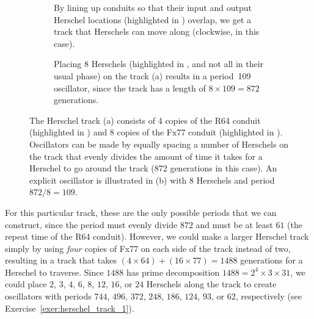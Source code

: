 \begin{figure}[!htb]
	\centering
	\begin{subfigure}{.48\textwidth}
		\centering
		\caption{By lining up conduits so that their input and output Herschel locations (highlighted in ) overlap, we get a track that Herschels can move along (clockwise, in this case).}
		\label{fig:herschel_track_1}
	\end{subfigure} \hfill %
	\begin{subfigure}{.48\textwidth}
		\centering
		\caption{Placing $8$ Herschels (highlighted in , and not all in their usual phase) on the track (a) results in a period~109 oscillator, since the track has a length of $8 \times 109 = 872$ generations.}
		\label{fig:herschel_track_1_109}
	\end{subfigure}
	\caption{The Herschel track (a) consists of 4 copies of the R64 conduit (highlighted in ) and 8 copies of the Fx77 conduit (highlighted in ). Oscillators can be made by equally spacing a number of Herschels on the track that evenly divides the amount of time it takes for a Herschel to go around the track (872 generations in this case). An explicit oscillator is illustrated in (b) with $8$ Herschels and period $872/8 = 109$.}\label{fig:herschel_track_oscillators}
\end{figure}

For this particular track, these are the only possible periods that we can construct, since the period must evenly divide $872$ and must be at least $61$ (the repeat time of the R64 conduit). However, we could make a larger Herschel track simply by using \emph{four} copies of Fx77 on each side of the track instead of two, resulting in a track that takes $(4 \times 64) + (16 \times 77) = 1488$ generations for a Herschel to traverse. Since $1488$ has prime decomposition $1488 = 2^4 \times 3 \times 31$, we could place $2$, $3$, $4$, $6$, $8$, $12$, $16$, or $24$ Herschels along the track to create oscillators with periods $744$, $496$, $372$, $248$, $186$, $124$, $93$, or $62$, respectively (see Exercise~\ref{exer:herschel_track_1}).

